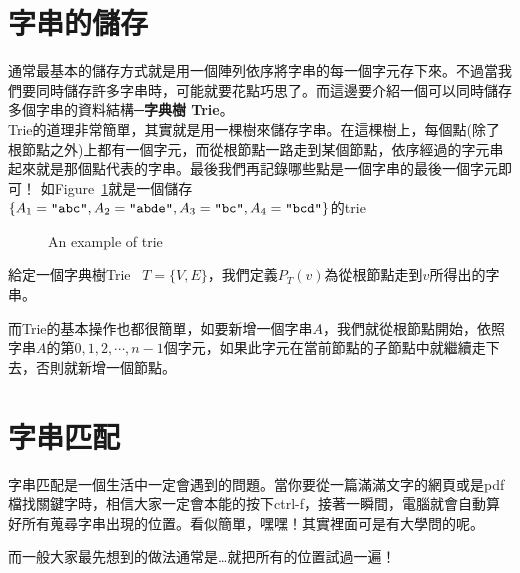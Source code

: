 \documentclass[a4paper,12pt]{book}
\begin{document}
\section{字串的儲存}
通常最基本的儲存方式就是用一個陣列依序將字串的每一個字元存下來。不過當我們要同時儲存許多字串時，可能就要花點巧思了。而這邊要介紹一個可以同時儲存多個字串的資料結構─{\bf  字典樹 Trie}。\\
Trie的道理非常簡單，其實就是用一棵樹來儲存字串。在這棵樹上，每個點(除了根節點之外)上都有一個字元，而從根節點一路走到某個節點，依序經過的字元串起來就是那個點代表的字串。最後我們再記錄哪些點是一個字串的最後一個字元即可！
如Figure~\ref{fig:trie}就是一個儲存$\{A_1 = \texttt{"abc"}, A_2 =\texttt{"abde"}, A_3 = \texttt{"bc"}, A_4 = \texttt{"bcd"}\}$的trie
\begin{figure}[H]
  \centering
  \caption{An example of trie}
  \label{fig:trie}
\end{figure}
%
\begin{theorem}[定義]
  給定一個字典樹Trie \  $T = \{V, E\}$，我們定義$P_T(v)$為從根節點走到$v$所得出的字串。
\end{theorem}
而Trie的基本操作也都很簡單，如要新增一個字串$A$，我們就從根節點開始，依照字串$A$的第$0, 1, 2, \cdots, n-1$個字元，如果此字元在當前節點的子節點中就繼續走下去，否則就新增一個節點。

\section{字串匹配}
  字串匹配是一個生活中一定會遇到的問題。當你要從一篇滿滿文字的網頁或是pdf檔找關鍵字時，相信大家一定會本能的按下ctrl-f，接著一瞬間，電腦就會自動算好所有蒐尋字串出現的位置。看似簡單，嘿嘿！其實裡面可是有大學問的呢。


而一般大家最先想到的做法通常是…就把所有的位置試過一遍！ 
\end{document}
